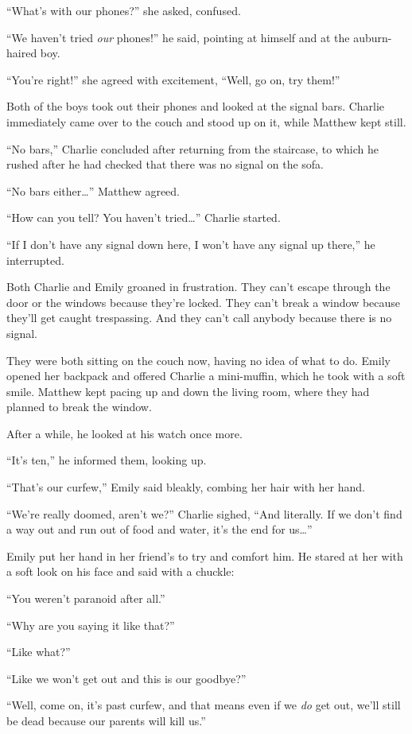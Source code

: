 “What's with our phones?” she asked, confused.

“We haven't tried \textit{our} phones!” he said, pointing at himself and at the auburn-haired boy.

“You're right!” she agreed with excitement, “Well, go on, try them!”

Both of the boys took out their phones and looked at the signal bars. Charlie immediately came over to the couch and stood up on it, while Matthew kept still.

“No bars,” Charlie concluded after returning from the staircase, to which he rushed after he had checked that there was no signal on the sofa.

“No bars either…” Matthew agreed.

“How can you tell? You haven't tried…” Charlie started.

“If I don't have any signal down here, I won't have any signal up there,” he interrupted.

Both Charlie and Emily groaned in frustration. They can't escape through the door or the windows because they're locked. They can't break a window because they'll get caught trespassing. And they can't call anybody because there is no signal.

They were both sitting on the couch now, having no idea of what to do. Emily opened her backpack and offered Charlie a mini-muffin, which he took with a soft smile. Matthew kept pacing up and down the living room, where they had planned to break the window.

After a while, he looked at his watch once more.

“It's ten,” he informed them, looking up.

“That's our curfew,” Emily said bleakly, combing her hair with her hand.

“We're really doomed, aren't we?” Charlie sighed, “And literally. If we don't find a way out and run out of food and water, it's the end for us…”

Emily put her hand in her friend's to try and comfort him. He stared at her with a soft look on his face and said with a chuckle:

“You weren't paranoid after all.”

“Why are you saying it like that?”

“Like what?”

“Like we won't get out and this is our goodbye?”

“Well, come on, it's past curfew, and that means even if we \textit{do} get out, we'll still be dead because our parents will kill us.”

